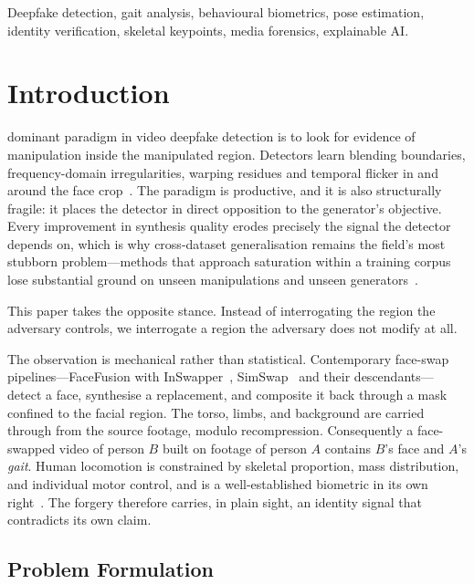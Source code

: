 \documentclass[journal]{IEEEtran}
\begin{document}
\begin{IEEEkeywords}
Deepfake detection, gait analysis, behavioural biometrics, pose estimation,
identity verification, skeletal keypoints, media forensics, explainable AI.
\end{IEEEkeywords}

\section{Introduction}
\label{sec:intro}

 dominant paradigm in video deepfake detection is to look
for evidence of manipulation inside the manipulated region. Detectors learn
blending boundaries, frequency-domain irregularities, warping residues and
temporal flicker in and around the face
crop~\cite{recce,multi_attn,ftcn,altfreezing,fsbi}. The paradigm is
productive, and it is also structurally fragile: it places the detector in
direct opposition to the generator's objective. Every improvement in synthesis
quality erodes precisely the signal the detector depends on, which is why
cross-dataset generalisation remains the field's most stubborn
problem---methods that approach saturation within a training corpus lose
substantial ground on unseen manipulations and unseen
generators~\cite{recce,ftcn,deepfake_eval}.

This paper takes the opposite stance. Instead of interrogating the region the
adversary controls, we interrogate a region the adversary does not modify at
all.

The observation is mechanical rather than statistical. Contemporary face-swap
pipelines---FaceFusion with InSwapper~\cite{facefusion,insightface},
SimSwap~\cite{simswap} and their descendants---detect a face, synthesise a
replacement, and composite it back through a mask confined to the facial
region. The torso, limbs, and background are carried through from the source
footage, modulo recompression. Consequently a face-swapped video of person $B$
built on footage of person $A$ contains $B$'s face and $A$'s \emph{gait}. Human
locomotion is constrained by skeletal proportion, mass distribution, and
individual motor control, and is a well-established biometric in its own
right~\cite{gaitgraph,gaitpt,gaitformer,perry_gait,winter_biomech}. The forgery
therefore carries, in plain sight, an identity signal that contradicts its own
claim.

\subsection{Problem Formulation}
\end{document}
